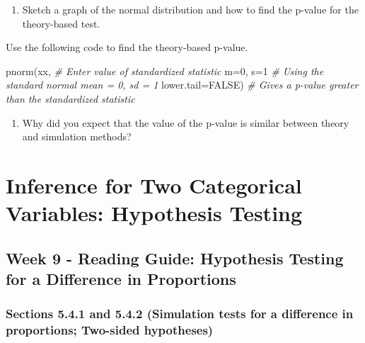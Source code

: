 \documentclass[
]{report}
\newenvironment{Shaded}{\begin{snugshade}}{\end{snugshade}}
\newcommand{\AttributeTok}[1]{\textcolor[rgb]{0.77,0.63,0.00}{#1}}
\newcommand{\CommentTok}[1]{\textcolor[rgb]{0.56,0.35,0.01}{\textit{#1}}}
\newcommand{\ConstantTok}[1]{\textcolor[rgb]{0.00,0.00,0.00}{#1}}
\newcommand{\DecValTok}[1]{\textcolor[rgb]{0.00,0.00,0.81}{#1}}
\newcommand{\FunctionTok}[1]{\textcolor[rgb]{0.00,0.00,0.00}{#1}}
\newcommand{\NormalTok}[1]{#1}
\providecommand{\tightlist}{%
  \setlength{\itemsep}{0pt}\setlength{\parskip}{0pt}}
\begin{document}
\vspace{0.8in}

\begin{enumerate}
\def\labelenumi{\arabic{enumi}.}
\setcounter{enumi}{11}
\tightlist
\item
  Sketch a graph of the normal distribution and how to find the p-value for the theory-based test.
\end{enumerate}

\vspace{1.4in}

Use the following code to find the theory-based p-value.

\begin{Shaded}
\begin{Highlighting}[]
\FunctionTok{pnorm}\NormalTok{(xx, }\CommentTok{\# Enter value of standardized statistic}
      \AttributeTok{m=}\DecValTok{0}\NormalTok{, }\AttributeTok{s=}\DecValTok{1} \CommentTok{\# Using the standard normal mean = 0, sd = 1}
      \AttributeTok{lower.tail=}\ConstantTok{FALSE}\NormalTok{) }\CommentTok{\# Gives a p{-}value greater than the standardized statistic}
\end{Highlighting}
\end{Shaded}

\begin{enumerate}
\def\labelenumi{\arabic{enumi}.}
\setcounter{enumi}{12}
\tightlist
\item
  Why did you expect that the value of the p-value is similar between theory and simulation methods?
\end{enumerate}

\newpage

\hypertarget{inference-for-two-categorical-variables-hypothesis-testing}{%
\chapter{Inference for Two Categorical Variables: Hypothesis Testing}\label{inference-for-two-categorical-variables-hypothesis-testing}}

\hypertarget{week-9---reading-guide-hypothesis-testing-for-a-difference-in-proportions}{%
\section{Week 9 - Reading Guide: Hypothesis Testing for a Difference in Proportions}\label{week-9---reading-guide-hypothesis-testing-for-a-difference-in-proportions}}

\hypertarget{sections-5.4.1-and-5.4.2-simulation-tests-for-a-difference-in-proportions-two-sided-hypotheses}{%
\subsection*{Sections 5.4.1 and 5.4.2 (Simulation tests for a difference in proportions; Two-sided hypotheses)}\label{sections-5.4.1-and-5.4.2-simulation-tests-for-a-difference-in-proportions-two-sided-hypotheses}}
\end{document}
